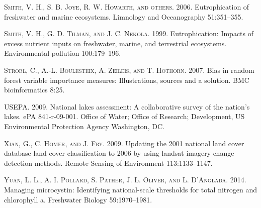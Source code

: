 \documentclass[11pt,]{article}
\begin{document}
\textsc{Smith, V. H., S. B. Joye, R. W. Howarth, and others}. 2006.
Eutrophication of freshwater and marine ecosystems. Limnology and
Oceanography 51:351--355.

\textsc{Smith, V. H., G. D. Tilman, and J. C. Nekola}. 1999.
Eutrophication: Impacts of excess nutrient inputs on freshwater, marine,
and terrestrial ecosystems. Environmental pollution 100:179--196.

\textsc{Strobl, C., A.-L. Boulesteix, A. Zeileis, and T. Hothorn}. 2007.
Bias in random forest variable importance measures: Illustrations,
sources and a solution. BMC bioinformatics 8:25.

\textsc{USEPA}. 2009. National lakes assessment: A collaborative survey
of the nation's lakes. ePA 841-r-09-001. Office of Water; Office of
Research; Development, US Environmental Protection Agency Washington,
DC.

\textsc{Xian, G., C. Homer, and J. Fry}. 2009. Updating the 2001
national land cover database land cover classification to 2006 by using
landsat imagery change detection methods. Remote Sensing of Environment
113:1133--1147.

\textsc{Yuan, L. L., A. I. Pollard, S. Pather, J. L. Oliver, and L.
D'Anglada}. 2014. Managing microcystin: Identifying national-scale
thresholds for total nitrogen and chlorophyll a. Freshwater Biology
59:1970--1981.
\end{document}
